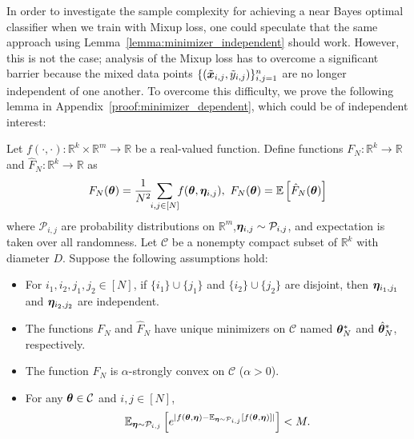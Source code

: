 In order to investigate the sample complexity for achieving a near Bayes optimal classifier when we train with Mixup loss, one could speculate that the same approach using Lemma~\ref{lemma:minimizer_independent} should work. However, this is not the case; analysis of the Mixup loss has to overcome a significant barrier because the mixed data points $\{(\tilde{{\bm{x}}}_{i,j}, \tilde{y}_{i,j})\}_{i,j=1}^n$ are no longer independent of one another. To overcome this difficulty, we prove the following lemma in Appendix~\ref{proof:minimizer_dependent}, which could be of independent interest:
\begin{lemma}\label{lemma:minimizer_dependent}
Let $f(\cdot, \cdot) : \mathbb{R}^k \times \mathbb{R}^m \rightarrow \mathbb{R}$ be a real-valued function. Define functions $F_N :  \mathbb{R}^k \rightarrow \mathbb{R}$ and $\hat{F}_N : \mathbb{R}^k \rightarrow \mathbb{R}$ as
\begin{equation*}
    F_N({\bm{\theta}}) = \frac{1}{N^2}\!\! \sum_{i,j\in [N]}\!\! f({\bm{\theta}}, {\bm{\eta}}_{i,j}), ~F_N({\bm{\theta}}) = \mathbb{E}\left[ \hat{F}_N({\bm{\theta}}) \right]
\end{equation*}
where  $\mathcal{P}_{i,j}$ are probability distributions on $\mathbb{R}^m$,${\bm{\eta}}_{i,j} \sim \mathcal{P}_{i,j}$, and expectation is taken over all randomness. Let $\mathcal{C}$ be a nonempty compact subset of $\mathbb{R}^k$ with diameter $D$. Suppose the following assumptions hold:
\begin{itemize}[leftmargin=3.5mm]
\vspace{-5pt}
\item  For $i_1,i_2,j_1,j_2\in [N]$, if $\{i_1\}\cup \{ j_1\}$ and $ \{i_2\}\cup \{j_2\}$ are disjoint, then ${\bm{\eta}}_{i_1, j_1}$ and  ${\bm{\eta}}_{i_2, j_2}$ are independent.
\vspace{-5pt}
\item  The functions $F_N$ and $\hat{F}_N$ have unique minimizers on $\mathcal{C}$ named ${\bm{\theta}}_N^*$ and $\hat{{\bm{\theta}}}_N^*$, respectively.
\vspace{-5pt}
\item The function $F_N$ is $\alpha$-strongly convex on $\mathcal{C}$ ($\alpha>0$).
\vspace{-5pt}
\item For any ${\bm{\theta}} \in \mathcal{C}$ and $i,j\in[N]$, 
\begin{equation*}
    \mathbb{E}_{\veta \sim \mathcal{P}_{i,j}}\left [e^{|f(\vtheta, \veta)- \mathbb{E}_{\veta \sim \mathcal{P}_{i,j}}[f(\vtheta, \veta)] |} \right]<M.
    \vspace{-10pt}

\end{equation*}
\end{itemize}
\end{lemma}
